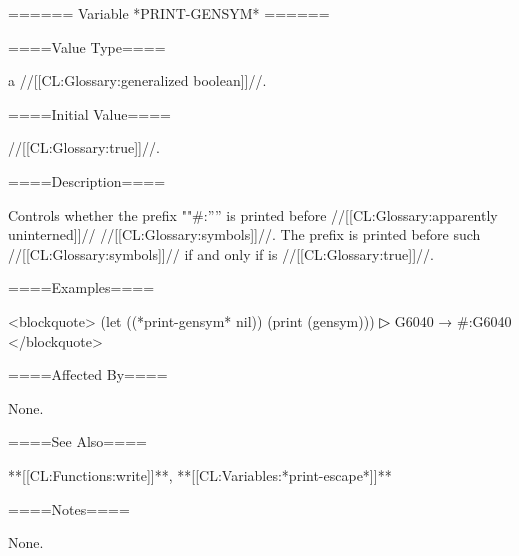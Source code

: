 ====== Variable *PRINT-GENSYM* ======

====Value Type====

a //[[CL:Glossary:generalized boolean]]//.

====Initial Value====

//[[CL:Glossary:true]]//.

====Description====

Controls whether the prefix ""#:'''' is printed before //[[CL:Glossary:apparently uninterned]]// //[[CL:Glossary:symbols]]//. The prefix is printed before such //[[CL:Glossary:symbols]]// if and only if  is //[[CL:Glossary:true]]//.

====Examples====

<blockquote> (let ((*print-gensym* nil)) (print (gensym)))
▷ G6040 → #:G6040 </blockquote>

====Affected By====

None.

====See Also====

**[[CL:Functions:write]]**, **[[CL:Variables:*print-escape*]]**

====Notes====

None.

